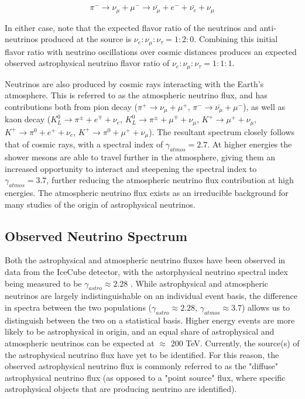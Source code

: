 \begin{equation}
    \pi^- \rightarrow \nu_{\mu} + \mu^- \rightarrow \bar{\nu_{\mu}} + e ^- + \bar{\nu_{e}}+\nu_{\mu}
\label{nuprodeq2}
\end{equation}

In either case, note that the expected flavor ratio of the neutrinos and anti-neutrinos produced at the source is $\nu_e : \nu_{\mu} : \nu_{\tau} = 1 : 2 : 0$. Combining this initial flavor ratio with neutrino oscillations over cosmic distances produces an expected observed astrophysical neutrino flavor ratio of $\nu_e : \nu_{\mu} : \nu_{\tau} = 1 : 1 : 1$.

Neutrinos are also produced by cosmic rays interacting with the Earth's atmosphere. This is referred to as the atmospheric neutrino flux, and has contributions both from pion decay ($\pi^+ \rightarrow \nu_{\mu} + \mu^+$, $\pi^- \rightarrow \bar{\nu_{\mu}} + \mu^-$), as well as kaon decay ($K^0_L \rightarrow \pi^\pm+ e^\mp +\nu_e$, $K^0_L \rightarrow \pi^\pm+ \mu^\mp +\nu_\mu$, $K^+ \rightarrow \mu^+ +\nu_\mu$, $K^+ \rightarrow \pi^0 + e^+ +\nu_e$, $K^+ \rightarrow \pi^0 + \mu^+ +\nu_\mu$). The resultant spectrum closely follows that of cosmic rays, with a spectral index of $\gamma_{atmos}=2.7$. At higher energies the shower mesons are able to travel further in the atmosphere, giving them an increased opportunity to interact and steepening the spectral index to $\gamma_{atmos}=3.7$, further reducing the atmospheric neutrino flux contribution at high energies. The atmospheric neutrino flux exists as an irreducible background for many studies of the origin of astrophysical neutrinos. 

\subsection{Observed Neutrino Spectrum}
Both the astrophysical and atmospheric neutrino fluxes have been observed in data from the IceCube detector, with the astorphysical neutrino spectral index being measured to be $\gamma_{astro} \approx 2.28$ \cite{stettner2019measurement}.  While astrophysical and atmospheric neutrinos are largely indistinguishable on an individual event basis, the difference in spectra between the two populations ($\gamma_{astro} \approx 2.28$, $\gamma_{atmos} \approx 3.7$) allows us to distinguish between the two on a statistical basis. Higher energy events are more likely to be astrophysical in origin, and an equal share of astrophysical and atmospheric neutrinos can be expected at $\approx$ 200 TeV. Currently, the source(s) of the astrophysical neutrino flux have yet to be identified. For this reason, the observed astrophysical neutrino flux is commonly referred to as the "diffuse" astrophysical neutrino flux (as opposed to a "point source" flux, where specific astrophysical objects that are producing neutrino are identified).

